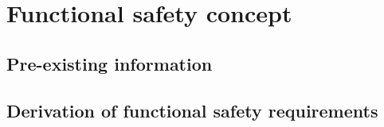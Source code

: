 \section{Functional safety concept}
%
% 

\subsection{Pre-existing information}
%

\subsection{Derivation of functional safety requirements}
%
%
%
%
%
%

